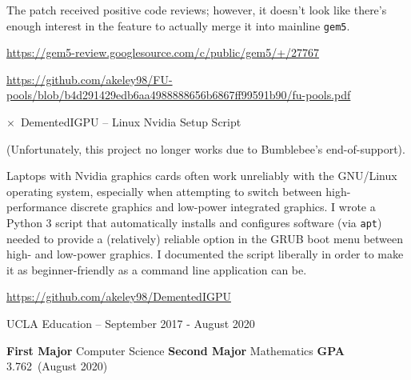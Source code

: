 \documentclass[11pt]{article}
\newcommand{\web}[1]{{ \color{webColor} \small \url{#1}}}
\newcommand{\myTitle}[1]{{ \vspace{2mm} \LARGE \color{titleColor} \textsf{#1}\vspace{2mm}}}
\newcommand{\mySub}[1]{{\color{subColor}\hspace{-6mm} \( \times \)\ \textsf{#1}}}
\newcommand{\myKey}[1]{{\color{keyColor}\textbf{#1}}}
\newcommand{\GPA}{3.762}
\newcommand{\GpaDate}{August 2020}
\begin{document}
The patch received positive code reviews; however, it doesn't look
like there's enough interest in the feature to actually merge it into
mainline \texttt{gem5}.

\web{https://gem5-review.googlesource.com/c/public/gem5/+/27767}

\web{https://github.com/akeley98/FU-pools/blob/b4d291429edb6aa4988888656b6867ff99591b90/fu-pools.pdf}

\mySub{DementedIGPU -- Linux Nvidia Setup Script}

(Unfortunately, this project no longer works due to Bumblebee's
end-of-support).

Laptops with Nvidia graphics cards often work unreliably with the
GNU/Linux operating system, especially when attempting to switch
between high-performance discrete graphics and low-power integrated
graphics. I wrote a Python 3 script that automatically installs and
configures software (via \texttt{apt}) needed to provide a
(relatively) reliable option in the GRUB boot menu between high- and
low-power graphics. I documented the script liberally in order to make
it as beginner-friendly as a command line application can be.

\web{https://github.com/akeley98/DementedIGPU}

\newpage
\myTitle{UCLA Education -- September 2017 - August 2020}

\myKey{First Major} Computer Science \hfill\myKey{Second Major}
Mathematics \hfill\myKey{GPA} \GPA\ (\GpaDate)
\end{document}
